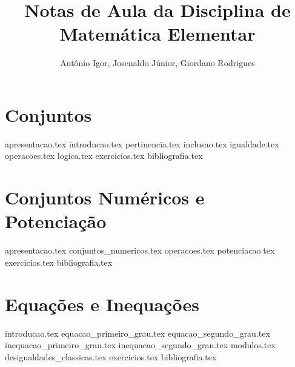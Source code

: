\documentclass[a4paper,12pt, oneside]{book}
\begin{document}
    \title{Notas de Aula da Disciplina de Matemática Elementar}
    \author{Antônio Igor, Josenaldo Júnior, Giordano Rodrigues} 

    \frontmatter %
    \maketitle
    \tableofcontents

    \mainmatter %

    \chapter{Conjuntos}
    {apresentacao.tex}
    {introducao.tex}
    {pertinencia.tex}
    {inclusao.tex}
    {igualdade.tex}
    {operacoes.tex}
    {logica.tex}
    {exercicios.tex}
    {bibliografia.tex} %

    \chapter{Conjuntos Numéricos e Potenciação}    
    {apresentacao.tex}
    {conjuntos_numericos.tex}
    {operacoes.tex}
    {potenciacao.tex}
    {exercicios.tex}
    {bibliografia.tex} %

    \chapter{Equações e Inequações}
    {introducao.tex}
    {equacao_primeiro_grau.tex}
    {equacao_segundo_grau.tex}
    {inequacao_primeiro_grau.tex}
    {inequacao_segundo_grau.tex}
    {modulos.tex}
    {desigualdades_classicas.tex}
    {exercicios.tex}
    {bibliografia.tex} %
\end{document}

